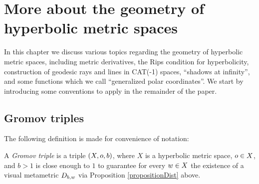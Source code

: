 


\chapter{More about the geometry of hyperbolic metric spaces}\label{sectiongeometry2}

In this chapter we discuss various topics regarding the geometry of hyperbolic metric spaces, including metric derivatives, the Rips condition for hyperbolicity, construction of geodesic rays and lines in CAT(-1) spaces, ``shadows at infinity'', and some functions which we call ``generalized polar coordinates''. We start by introducing some conventions to apply in the remainder of the paper.

\section{Gromov triples}
\label{standingassumptions2}

The following definition is made for convenience of notation:

\begin{definition}
\label{definitiongromovtriple}
A \emph{Gromov triple} is a triple $(X,o,b)$, where $X$ is a hyperbolic metric space, $o\in X$, and $b > 1$ is close enough to $1$ to guarantee for every $w\in X$ the existence of a visual metametric $D_{b,w}$ via Proposition \ref{propositionDist} above.
\end{definition}

